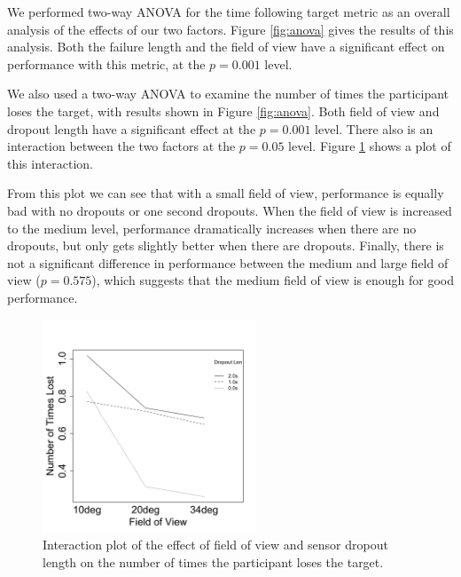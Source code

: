\documentclass{acmsiggraph}                     %
\begin{document}


We performed two-way {ANOVA} for the time following target metric as an overall analysis of the effects of our two factors.  Figure \ref{fig:anova} gives the results of this analysis.  Both the failure length and the field of view have a significant effect on performance with this metric, at the $p=0.001$ level.

We also used a two-way {ANOVA} to examine the number of times the participant loses the target, with results shown in Figure \ref{fig:anova}.  Both field of view and dropout length have a significant effect at the $p=0.001$ level.  There also is an interaction between the two factors at the $p=0.05$ level.  Figure \ref{fig:interaction} shows a plot of this interaction.  

From this plot we can see that with a small field of view, performance is equally bad with no dropouts or one second dropouts.  
When the field of view is increased to the medium level, performance dramatically increases when there are no dropouts, but only gets slightly better when there are dropouts.  Finally, there is not a significant difference in performance between the medium and large field of view ($p=0.575$), which suggests that the medium field of view is enough for good performance.

\begin{figure}[t]
	\centering
	\includegraphics[width=2.5in]{figures/numtimes_interaction.pdf}
	\caption{\label{fig:interaction}Interaction plot of the effect of field of view and sensor dropout length on the number of times the participant loses the target.}
\end{figure}
\end{document}
